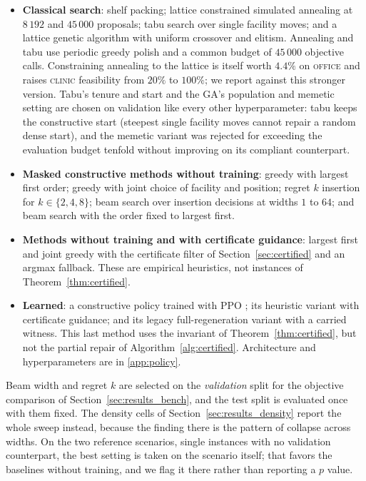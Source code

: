 \documentclass[preprint,12pt,authoryear]{elsarticle}
\begin{document}
\begin{itemize}
\item \textbf{Classical search}: shelf packing; lattice constrained simulated
annealing at $8\,192$ and $45\,000$ proposals; tabu search
\citep{Glover1989Tabu} over single facility moves; and a lattice genetic
algorithm with uniform crossover and elitism. Annealing and tabu use periodic
greedy polish and a common budget of $45\,000$ objective calls.
Constraining annealing to the lattice is itself worth $4.4\%$ on
\textsc{office} and raises \textsc{clinic} feasibility from $20\%$ to $100\%$;
we report against this stronger version. Tabu's tenure and start and the GA's
population and memetic setting are chosen on validation like every other
hyperparameter: tabu keeps the constructive start (steepest single facility
moves cannot repair a random dense start), and the memetic variant was
rejected for exceeding the evaluation budget tenfold without improving on its
compliant counterpart.
\item \textbf{Masked constructive methods without training}: greedy with largest first
order; greedy with joint choice of facility and position; regret $k$ insertion for
$k\in\{2,4,8\}$; beam search over insertion decisions at widths $1$ to $64$; and
beam search with the order fixed to largest first.
\item \textbf{Methods without training and with certificate guidance}: largest first and joint greedy
with the certificate filter of Section~\ref{sec:certified} and an argmax fallback.
These are empirical heuristics, not instances of Theorem~\ref{thm:certified}.
\item \textbf{Learned}: a constructive policy trained with PPO
\citep{Schulman2017PPO}; its heuristic variant with certificate guidance; and its
legacy full-regeneration variant with a carried witness. This last method uses
the invariant of Theorem~\ref{thm:certified}, but not the partial repair of
Algorithm~\ref{alg:certified}. Architecture and hyperparameters are in
\ref{app:policy}.
\end{itemize}

Beam width and regret $k$ are selected on the \emph{validation} split for the
objective comparison of Section~\ref{sec:results_bench}, and the test split is
evaluated once with them fixed. The density cells of
Section~\ref{sec:results_density} report the whole sweep instead, because the
finding there is the pattern of collapse across widths. On the two reference
scenarios, single instances with no validation counterpart, the best setting
is taken on the scenario itself; that favors the baselines without training, and
we flag it there rather than reporting a $p$ value.
\end{document}
